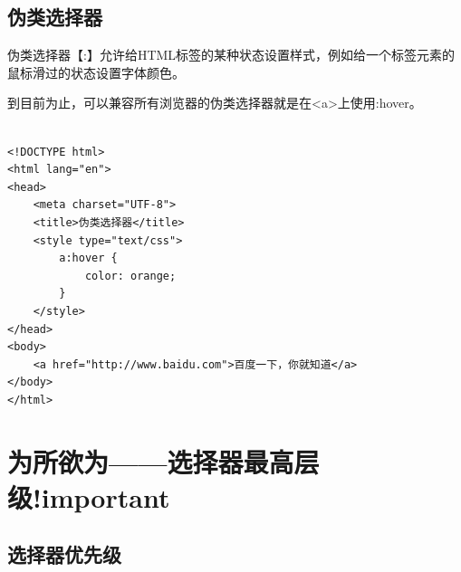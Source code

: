 \subsection{伪类选择器}

伪类选择器【:】允许给HTML标签的某种状态设置样式，例如给一个标签元素的鼠标滑过的状态设置字体颜色。

\begin{table}[H]
	\centering
	\caption{常用伪类选择器}
\end{table}

到目前为止，可以兼容所有浏览器的伪类选择器就是在<a>上使用:hover。\\

\\

\begin{lstlisting}[style=htmlcssjs]
<!DOCTYPE html>
<html lang="en">
<head>
    <meta charset="UTF-8">
    <title>伪类选择器</title>
    <style type="text/css">
        a:hover {
            color: orange;
        }
    </style>
</head>
<body>
    <a href="http://www.baidu.com">百度一下，你就知道</a>
</body>
</html>
\end{lstlisting}

\newpage

\section{为所欲为——选择器最高层级!important}

\subsection{选择器优先级}

